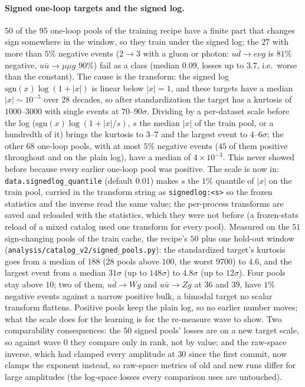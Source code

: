 \documentclass[11pt]{article}
\newcommand{\code}[1]{\texttt{#1}}
\begin{document}
\paragraph{Signed one-loop targets and the signed log.} $50$ of the $95$ one-loop pools of the
training recipe have a finite part that changes sign somewhere in the window, so they train
under the signed log; the $27$ with more than $5\%$ negative events ($2\to3$ with a gluon or
photon: $u\bar d\to e\nu g$ is $81\%$ negative, $u\bar u\to\mu\mu g$ $90\%$) fail as a class
(median $0.09$, losses up to $3.7$, i.e.\ worse than the constant). The cause is the transform: the signed
log $\mathrm{sgn}(x)\log(1+|x|)$ is linear below $|x|=1$, and these targets have a median
$|x|\sim10^{-5}$ over $28$ decades, so after standardization the target has a kurtosis of
$1000$--$3000$ with single events at $70$--$90\sigma$. Dividing by a per-dataset scale before
the log ($\mathrm{sgn}(x)\log(1+|x|/s)$, $s$ the median $|x|$ of the train pool, or a
hundredth of it) brings the kurtosis to $3$--$7$ and the largest event to $4$--$6\sigma$;
the other $68$ one-loop pools, with at most $5\%$ negative events ($45$ of them positive
throughout and on the plain log), have a median of $4\times10^{-3}$. This never showed before
because every earlier one-loop pool was positive. The scale is
now in: \code{data.signedlog\_quantile} (default $0.01$) makes $s$ the $1\%$ quantile of
$|x|$ on the train pool, carried in the transform string as \code{signedlog:<s>} so the
frozen statistics and the inverse read the same value; the per-process transforms are saved
and reloaded with the statistics, which they were not before (a frozen-stats reload of a
mixed catalog used one transform for every pool). Measured on the $51$ sign-changing pools
of the train cache, the recipe's $50$ plus one hold-out window
(\code{analysis/catalog\_v2/signed\_pools.py}): the standardized target's
kurtosis goes from a median of $188$ ($28$ pools above $100$, the worst $9700$) to $4.6$,
and the largest event from a median $31\sigma$ (up to $148\sigma$) to $4.8\sigma$ (up to
$12\sigma$). Four pools stay above $10$; two of them, $u\bar d\to Wg$ and $u\bar u\to Zg$ at
$36$ and $39$, have $1\%$ negative events against a narrow positive bulk, a bimodal target
no scalar transform flattens. Positive pools keep the plain log, so no earlier number
moves; what the scale does for the learning is for the re-measure wave to show. Two
comparability consequences: the $50$ signed pools' losses are on a new target scale, so
against wave 0 they compare only in rank, not by value; and the raw-space inverse,
which had clamped every amplitude at $30$ since the first commit, now clamps the exponent
instead, so raw-space metrics of old and new runs differ for large amplitudes (the
log-space losses every comparison uses are untouched).
\end{document}
